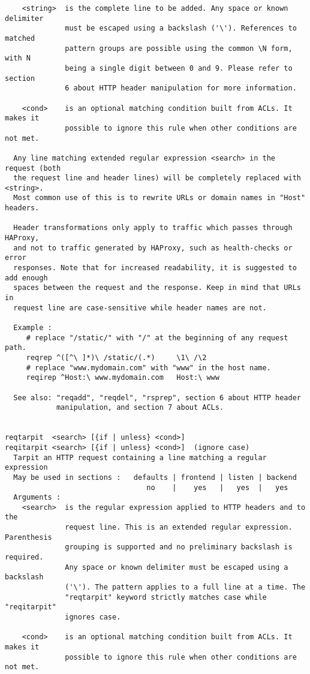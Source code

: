 \begin{verbatim}
    <string>  is the complete line to be added. Any space or known delimiter
              must be escaped using a backslash ('\'). References to matched
              pattern groups are possible using the common \N form, with N
              being a single digit between 0 and 9. Please refer to section
              6 about HTTP header manipulation for more information.

    <cond>    is an optional matching condition built from ACLs. It makes it
              possible to ignore this rule when other conditions are not met.

  Any line matching extended regular expression <search> in the request (both
  the request line and header lines) will be completely replaced with <string>.
  Most common use of this is to rewrite URLs or domain names in "Host" headers.

  Header transformations only apply to traffic which passes through HAProxy,
  and not to traffic generated by HAProxy, such as health-checks or error
  responses. Note that for increased readability, it is suggested to add enough
  spaces between the request and the response. Keep in mind that URLs in
  request line are case-sensitive while header names are not.

  Example :
     # replace "/static/" with "/" at the beginning of any request path.
     reqrep ^([^\ ]*)\ /static/(.*)     \1\ /\2
     # replace "www.mydomain.com" with "www" in the host name.
     reqirep ^Host:\ www.mydomain.com   Host:\ www

  See also: "reqadd", "reqdel", "rsprep", section 6 about HTTP header
            manipulation, and section 7 about ACLs.


reqtarpit  <search> [{if | unless} <cond>]
reqitarpit <search> [{if | unless} <cond>]  (ignore case)
  Tarpit an HTTP request containing a line matching a regular expression
  May be used in sections :   defaults | frontend | listen | backend
                                 no    |    yes   |   yes  |   yes
  Arguments :
    <search>  is the regular expression applied to HTTP headers and to the
              request line. This is an extended regular expression. Parenthesis
              grouping is supported and no preliminary backslash is required.
              Any space or known delimiter must be escaped using a backslash
              ('\'). The pattern applies to a full line at a time. The
              "reqtarpit" keyword strictly matches case while "reqitarpit"
              ignores case.

    <cond>    is an optional matching condition built from ACLs. It makes it
              possible to ignore this rule when other conditions are not met.


\end{verbatim}
